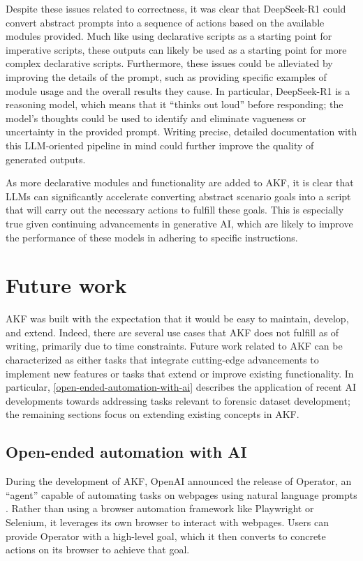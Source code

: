 \documentclass[letterpaper,12pt]{report}
\begin{document}
Despite these issues related to correctness, it was clear that
DeepSeek-R1 could convert abstract prompts into a sequence of actions
based on the available modules provided. Much like using declarative
scripts as a starting point for imperative scripts, these outputs can
likely be used as a starting point for more complex declarative scripts.
Furthermore, these issues could be alleviated by improving the details
of the prompt, such as providing specific examples of module usage and
the overall results they cause. In particular, DeepSeek-R1 is a
reasoning model, which means that it ``thinks out loud'' before
responding; the model's thoughts could be used to identify and eliminate
vagueness or uncertainty in the provided prompt. Writing precise,
detailed documentation with this LLM-oriented pipeline in mind could
further improve the quality of generated outputs.

As more declarative modules and functionality are added to AKF, it is
clear that LLMs can significantly accelerate converting abstract
scenario goals into a script that will carry out the necessary actions
to fulfill these goals. This is especially true given continuing
advancements in generative AI, which are likely to improve the
performance of these models in adhering to specific instructions.

\chapter{Future work}\label{chapter-eight}

AKF was built with the expectation that it would be easy to maintain,
develop, and extend. Indeed, there are several use cases that AKF does
not fulfill as of writing, primarily due to time constraints. Future
work related to AKF can be characterized as either tasks that integrate
cutting-edge advancements to implement new features or tasks that extend
or improve existing functionality. In particular, \autoref{open-ended-automation-with-ai} describes the application of
recent AI developments towards addressing tasks relevant to forensic
dataset development; the remaining sections focus on extending existing
concepts in AKF.

\section{Open-ended automation with
AI}\label{open-ended-automation-with-ai}

During the development of AKF, OpenAI announced the release of Operator,
an ``agent'' capable of automating tasks on webpages using natural
language prompts \cite{openaiIntroducingOperator2025}. Rather than
using a browser automation framework like Playwright or Selenium, it
leverages its own browser to interact with webpages. Users can provide
Operator with a high-level goal, which it then converts to concrete
actions on its browser to achieve that goal.
\end{document}
